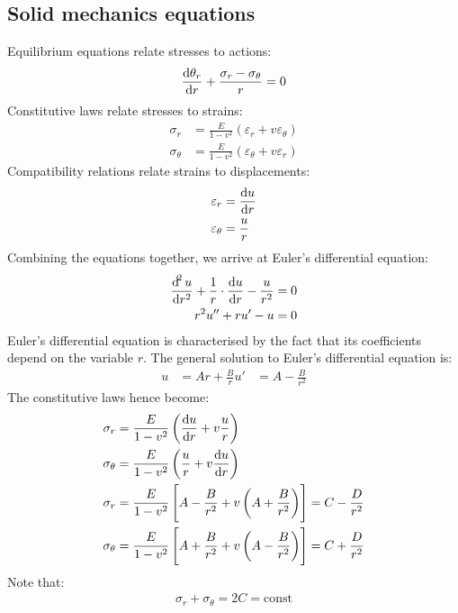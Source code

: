 \documentclass[class=report, crop=false, 12pt,a4paper]{standalone}
\begin{document}
\subsection{Solid mechanics equations}
Equilibrium equations relate stresses to actions:
\begin{align}
    \frac{\dif \theta_r}{\dif r} + \frac{\sigma_r - \sigma_{\theta}}{r} = 0
\end{align}
Constitutive laws relate stresses to strains:
\begin{align}
    \sigma_r &= \frac{E}{1-v^2}\left(\varepsilon_r + v \varepsilon_{\theta}\right)\\
    \sigma_{\theta} &= \frac{E}{1-v^2}\left(\varepsilon_{\theta}+v\varepsilon_{r}\right)
\end{align}
Compatibility relations relate strains to displacements:
\begin{align}
    \varepsilon_r &= \frac{\dif u}{\dif r}\\
    \varepsilon_{\theta} &= \frac{u}{r}
\end{align}
Combining the equations together, we arrive at Euler's differential equation:
\begin{align}
    \frac{\dif^2 u}{\dif r^2} + \frac{1}{r}\cdot\frac{\dif u}{\dif r} - \frac{u}{r^2} &= 0\\
    r^2 u'' + r u' - u &= 0
\end{align}
Euler's differential equation is characterised by the fact that its coefficients depend on the variable $r$. The general solution to Euler's differential equation is:
\begin{align}
    u &= Ar + \frac{B}{r}
    u' &= A - \frac{B}{r^2} 
\end{align}
The constitutive laws hence become:
\begin{align}
    \sigma_r &= \frac{E}{1-v^2}\left(\frac{\dif u}{\dif r} + v \frac{u}{r}\right)\\
    \sigma_{\theta} &= \frac{E}{1-v^2}\left(\frac{u}{r}+v\frac{\dif u}{\dif r}\right)\\
    \sigma_r &= \frac{E}{1-v^2}\left[A - \frac{B}{r^2} + v\left(A + \frac{B}{r^2}\right)\right] = C - \frac{D}{r^2}\\
    \sigma_{\theta} &= \frac{E}{1-v^2} \left[A + \frac{B}{r^2} + v\left(A-\frac{B}{r^2}\right)\right] = C + \frac{D}{r^2}
\end{align}
Note that:
\begin{align}
    \sigma_r + \sigma_{\theta} = 2C = \textrm{const}
\end{align}
\end{document}
